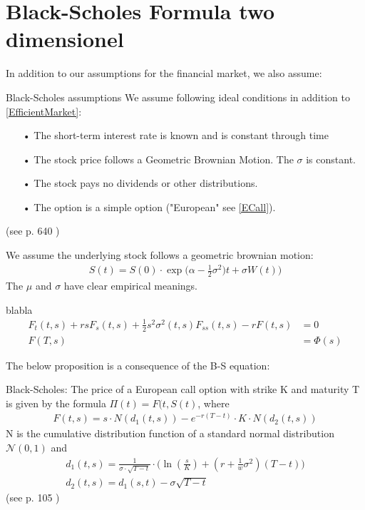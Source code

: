 
\section{Black-Scholes Formula two dimensionel}
In addition to our assumptions for the financial market, we also assume:\\
\theoremstyle{assumption}
\begin{assumption}{Black-Scholes assumptions}\label{BS-Assumption}
We assume following ideal conditions in addition to \eqref{EfficientMarket}:
\begin{enumerate}
\item[•] The short-term interest rate is known and is constant through time 
\item[•] The stock price follows a Geometric Brownian Motion. The $\sigma$ is constant.\item[•] The stock pays no dividends or other distributions.
\item[•] The option is a simple option ("European" see \eqref{ECall}).
\end{enumerate}
(see p. 640 \parencite{B-S-Paper})
\end{assumption}

We assume the underlying stock follows a geometric brownian motion:
\begin{equation}\label{GBM}
\begin{split}
S(t)=S(0) \cdot \exp \bigg( \alpha -\frac{1}{2} \sigma^2) t + \sigma W(t) \bigg)
\end{split}
\end{equation}
The $\mu$ and $\sigma$ have clear empirical meanings.


\begin{theorem}\label{BS-PDE}
blabla
\begin{align}
F_t(t,s)+rsF_s(t,s)+\frac{1}{2} s^2 \sigma^2(t,s)F_{ss}(t,s) -rF(t,s)&=0\\
F(T,s)&=\Phi(s)
\end{align}
\end{theorem}
The below proposition is a consequence of the B-S equation:

\theoremstyle{proposition}
\begin{proposition}{Black-Scholes: }\label{BS-price-EuroCall}
The price of a European call option with strike K and maturity T is given by the formula  $\Pi(t)=F(t,S(t)$, where
\begin{align*}
F(t,s)=s \cdot N(d_1(t,s)) - e^{-r(T-t)}\cdot K \cdot N(d_2(t,s))
\end{align*}
N is the cumulative distribution function of a standard normal distribution $\mathcal{N}(0,1)$ and
\begin{align*}
d_1(t,s)=\frac{1}{\sigma\cdot \sqrt{T-t}} \cdot \bigg( \ln(\frac{s}{K}) + (r+\frac{1}{w} \sigma^2) (T-t) \bigg)\\
d_2(t,s)=d_1(s,t)-\sigma \sqrt{T-t}
\end{align*}
(see p. 105 \parencite{	finKont})
\end{proposition}


